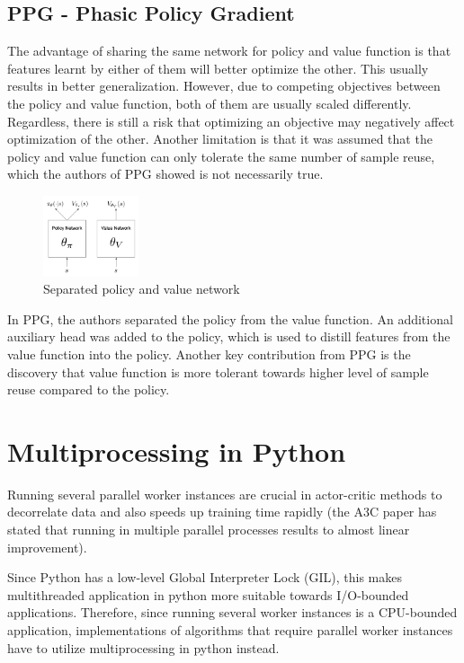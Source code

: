 \documentclass[11pt]{article} %
\begin{document}
\subsection{PPG - Phasic Policy Gradient}
The advantage of sharing the same network for policy and value function is that features learnt by either of them will better optimize the other. This usually results in better generalization. However, due to competing objectives between the policy and value function, both of them are usually scaled differently. Regardless, there is still a risk that optimizing an objective may negatively affect optimization of the other. Another limitation is that it was assumed that the policy and value function can only tolerate the same number of sample reuse, which the authors of PPG showed is not necessarily true.

\begin{figure}
    \centering
    \includegraphics[width=0.25\textwidth]{images/ppg.png}
    \caption{Separated policy and value network}
\end{figure}

In PPG, the authors separated the policy from the value function. An additional auxiliary head was added to the policy, which is used to distill features from the value function into the policy. Another key contribution from PPG is the discovery that value function is more tolerant towards higher level of sample reuse compared to the policy. 

\section{Multiprocessing in Python}
Running several parallel worker instances are crucial in actor-critic methods to decorrelate data and also speeds up training time rapidly (the A3C paper has stated that running in multiple parallel processes results to almost linear improvement).

Since Python has a low-level Global Interpreter Lock (GIL), this makes multithreaded application in python more suitable towards I/O-bounded applications. Therefore, since running several worker instances is a CPU-bounded application, implementations of algorithms that require parallel worker instances have to utilize multiprocessing in python instead.
\end{document}
